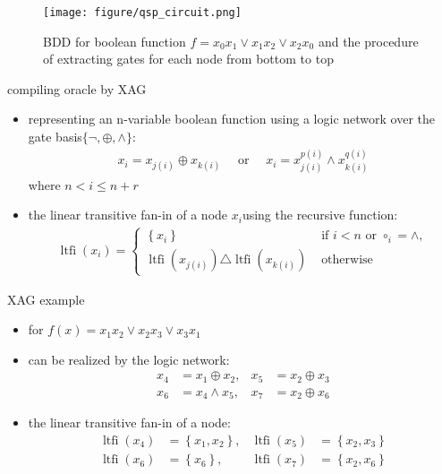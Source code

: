   \begin{frame}
    \begin{figure}[htbq]
      \centering
      \texttt{[image: figure/qsp\_circuit.png]}
      \caption{BDD  for boolean function $f= x_0x_1\vee x_1x_2 \vee x_2x_0 $ and  the  procedure  of  extracting  gates  for  each node from bottom to top} 
      \label{fig-qsp-example-circuit}
    \end{figure}
  \end{frame}
  \begin{frame}{compiling oracle by XAG}
    \begin{itemize}
      \item representing an n-variable boolean function using a logic network over the gate basis$\{\lnot ,\oplus ,\wedge \}$:
      \begin{align}
        x_{i} = x_{j(i)} \oplus x_{k(i)} \quad \text { or } \quad x_{i} = x_{j(i)}^{p(i)} \wedge x_{k(i)}^{q(i)}
      \end{align}
      where $n< i \leq n+r$
      \item  the linear transitive fan-in of a node $x_i $using the recursive function:
      \begin{align}
        \operatorname{ltfi}\left(x_{i}\right) = \left\{\begin{array}{ll}
        \left\{x_{i}\right\} & \text { if } i < n \text { or } \circ_{i}  = \wedge, \\
        \operatorname{ltfi}\left(x_{j(i)}\right) \triangle \operatorname{ltfi}\left(x_{k(i)}\right) & \text { otherwise }
        \end{array}\right.
      \end{align}
    \end{itemize}
  \end{frame}
  \begin{frame}{XAG example}
    \begin{itemize}
      \item for $f(x)=x_1x_2\vee x_2x_3\vee x_3x_1$
      \item can be realized by the logic network: 
      \begin{align}
        x_{4} & = x_{1} \oplus x_{2}, & x_{5} & = x_{2} \oplus x_{3} \\
        x_{6} & = x_{4} \wedge x_{5}, & x_{7} & = x_{2} \oplus x_{6}
      \end{align}
      \item the linear transitive fan-in of a node:
      \begin{align}
        \operatorname{ltfi}\left(x_{4}\right) & = \left\{x_{1}, x_{2}\right\} 
        ,&\operatorname{ltfi}\left(x_{5}\right) & = \left\{x_{2}, x_{3}\right\} \\
        \operatorname{ltfi}\left(x_{6}\right) & = \left\{x_{6}\right\} 
        ,&\operatorname{ltfi}\left(x_{7}\right) & = \left\{x_{2}, x_{6}\right\} 
      \end{align}
    \end{itemize}
  \end{frame}
  
